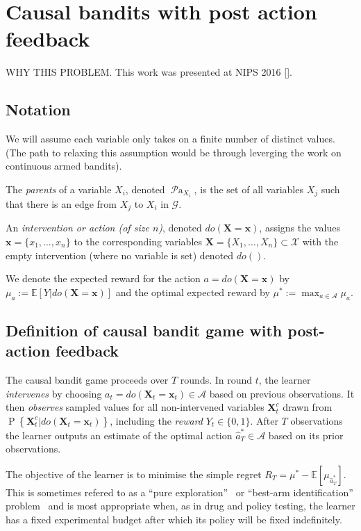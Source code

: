 \documentclass[11pt,a4paper,oneside]{book}
\newcommand{\simpleregret}{R_T}
\newcommand{\actions}{\mathcal{A}}
\newcommand{\E}[1]{\mathbb E\left[{#1}\right]}
\renewcommand{\P}[1]{\operatorname{P}\left\{#1\right\}}
\newcommand{\parents}[1]{\operatorname{\mathcal{P}a}_{#1}}
\renewcommand{\vec}[1]{\boldsymbol{#1}}
\begin{document}
\section*{Causal bandits with post action feedback}
WHY THIS PROBLEM. This work was presented at NIPS 2016 \ref{}.

\subsection*{Notation}

We will assume each variable only takes on a finite number of distinct values. (The path to relaxing this assumption would be through leverging the work on continuous armed bandits). 

The \emph{parents} of a variable $X_i$, denoted $\parents{X_i}$, is the set of all variables $X_j$ such that there is an edge from $X_j$ to $X_i$ in $\mathcal{G}$.

An \emph{intervention or action (of size $n$)}, denoted $do(\vec{X}=\vec{x})$, assigns the values $\vec{x}=\{x_1, \ldots, x_n\}$ to the corresponding variables $\vec{X}=\{X_1, \ldots, X_n\} \subset \mathcal{X}$ with the empty intervention (where no variable is set) denoted $do()$.


We denote the expected reward for the action $a = do(\vec{X} = \vec{x})$ by $\mu_{a} := \E{Y | do(\vec{X} = \vec{x})}$ and 
the optimal expected reward by $\mu^* := \max_{a\in\actions} \mu_{a}$. 


\subsection*{Definition of causal bandit game with post-action feedback}

The causal bandit game proceeds over $T$ rounds.
In round $t$, the learner \emph{intervenes} by choosing $a_t = do(\vec{X}_t = \vec{x}_t) \in \mathcal{A}$ based on previous observations. 
It then \emph{observes} sampled values for all non-intervened variables $\vec{X}^c_t$ drawn from $\P{\vec{X}^c_t | do(\vec{X}_t = \vec{x}_t)}$, 
including the \emph{reward} $Y_t \in \{0,1\}$. 
After $T$ observations the learner outputs an estimate of the optimal action $\hat a^*_T \in \actions$ based on its prior observations.

The objective of the learner is to minimise the simple regret $\simpleregret = \mu^* - \E{\mu_{\hat a^*_T}}.$ This is sometimes refered to as a ``pure exploration''~\citep{Bubeck2009a} or ``best-arm identification'' problem~\citep{Gabillon2012a} and is most appropriate when, as in drug and policy testing, the learner has a fixed experimental budget after which its policy will be fixed indefinitely. 
\end{document}
